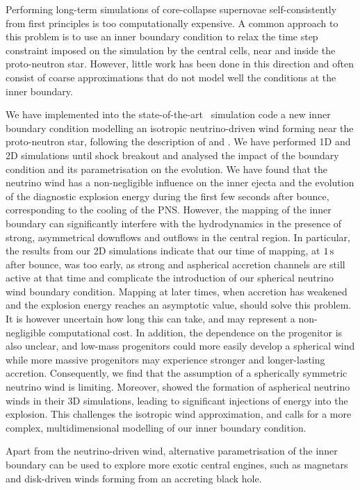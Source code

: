  \label{chap:outro}


Performing long-term simulations of core-collapse supernovae self-consistently from first principles is too computationally expensive. A common approach to this problem is to use an inner boundary condition to relax the time step constraint imposed on the simulation by the central cells, near and inside the proto-neutron star. However, little work has been done in this direction and often consist of coarse approximations that do not model well the conditions at the inner boundary.

We have implemented into the state-of-the-art \flash\ simulation code a new inner boundary condition modelling an isotropic neutrino-driven wind forming near the proto-neutron star, following the description of \cite{Wongwathanarat2015} and \cite{Stockinger2020}. We have performed 1D and 2D simulations until shock breakout and analysed the impact of the boundary condition and its parametrisation on the evolution. We have found that the neutrino wind has a non-negligible influence on the inner ejecta and the evolution of the diagnostic explosion energy during the first few seconds after bounce, corresponding to the cooling of the PNS. However, the mapping of the inner boundary can significantly interfere with the hydrodynamics in the presence of strong, asymmetrical downflows and outflows in the central region. In particular, the results from our 2D simulations indicate that our time of mapping, at \(1\,\mathrm{s}\) after bounce, was too early, as strong and aspherical accretion channels are still active at that time and complicate the introduction of our spherical neutrino wind boundary condition. Mapping at later times, when accretion has weakened and the explosion energy reaches an asymptotic value, should solve this problem. It is however uncertain how long this can take, and may represent a non-negligible computational cost. In addition, the dependence on the progenitor is also unclear, and low-mass progenitors could more easily develop a spherical wind while more massive progenitors may experience stronger and longer-lasting accretion. Consequently, we find that the assumption of a spherically symmetric neutrino wind is limiting. Moreover, \cite{Wang2023} showed the formation of aspherical neutrino winds in their 3D simulations, leading to significant injections of energy into the explosion. This challenges the isotropic wind approximation, and calls for a more complex, multidimensional modelling of our inner boundary condition.

Apart from the neutrino-driven wind, alternative parametrisation of the inner boundary can be used to explore more exotic central engines, such as magnetars and disk-driven winds forming from an accreting black hole.
